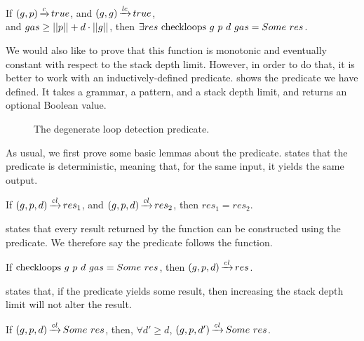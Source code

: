\begin{lemma}%
    If $(g,p) \operatorname{\xrightarrow{\mathit{c}}} true$,
    and $(g,g) \operatorname{\xrightarrow{\mathit{lc}}} true$, \\
    and $gas \ge ||p|| + d \cdot ||g||$,
    then $\exists res\ \checkloopscomp{g}{p}{d}{gas} = \Some res$.
    \label{lemma:checkloops-termination}
\end{lemma}

We would also like to prove that
this function is monotonic and
eventually constant with
respect to the stack depth limit.
However, in order to do that,
it is better to work with
an inductively-defined predicate.
 shows
the predicate we have defined.
It takes a grammar,
a pattern,
and a stack depth limit,
and returns an optional Boolean value.

\begin{figure}
    \centering
    
    \caption{The degenerate loop detection predicate.}
    \label{fig:checkloops}
\end{figure}

As usual, we first prove
some basic lemmas about the predicate.
states that the predicate
is deterministic,
meaning that, for the same input,
it yields the same output.

\begin{lemma}
    If $(g,p,d) \operatorname{\xrightarrow{\mathit{cl}}} res_1$,
    and $(g,p,d) \operatorname{\xrightarrow{\mathit{cl}}} res_2$,
    then $res_1 = res_2$.
    \label{lemma:checkloops-determinism}
\end{lemma}

states that every result returned by the function
can be constructed using the predicate.
We therefore say the predicate follows
the function.

\begin{lemma}
    If $\text{checkloops}\ g\ p\ d\ gas = Some\ res$,
    then $(g,p,d) \operatorname{\xrightarrow{\mathit{cl}}} res$.
    \label{lemma:checkloops-follows}
\end{lemma}

states that, if the predicate yields some result,
then increasing the stack depth limit
will not alter the result.

\begin{lemma}%
    If $(g,p,d) \operatorname{\xrightarrow{\mathit{cl}}} Some\ res$,
    then, $\forall d' \ge d$,
    $(g,p,d') \operatorname{\xrightarrow{\mathit{cl}}} Some\ res$.
    \label{lemma:checkloops-d-increase-no-overflow}
\end{lemma}

